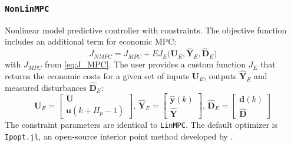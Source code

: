 \subsubsection{\textnormal{\texttt{NonLinMPC}}}
Nonlinear model predictive controller with constraints. The objective function includes an additional term for economic MPC:
\begin{equation}
J_{\mathit{NMPC}} = J_{\mathit{MPC}} 
    + E J_E\big(\mathbf{U}_E, \mathbf{\hat{Y}}_E, \mathbf{\hat{D}}_E\big)
\end{equation}
with $J_{\mathit{MPC}}$ from \eqref{eq:J_MPC}. The user provides a custom function $J_E$ that returns the economic costs for a given set of inputs $\mathbf{U}_E$, outputs $\mathbf{\hat{Y}}_E$ and measured disturbances $\mathbf{\hat{D}}_E$:
\begin{equation}
\mathbf{U}_E = 
\begin{bmatrix}
    \mathbf{U} \\ \mathbf{u}(k+H_p-1)
\end{bmatrix}\!,\,
\mathbf{\hat{Y}}_E = 
\begin{bmatrix}
    \mathbf{\hat{y}}(k) \\ \mathbf{\hat{Y}}
\end{bmatrix}\!,\, 
\mathbf{\hat{D}}_E = 
\begin{bmatrix}
    \mathbf{d}(k) \\ \mathbf{\hat{D}}
\end{bmatrix} 
\end{equation} 
The constraint parameters are identical to \texttt{LinMPC}. The default optimizer is \texttt{Ipopt.jl}, an open-source interior point method developed by \citet{ipopt}.
